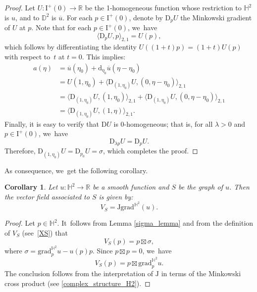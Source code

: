 \documentclass[11pt]{article}
\theoremstyle{plain}
\newtheorem{cor}{Corollary}[section]
\theoremstyle{definition}
\newcommand{\I}{\mathrm{I}}
\newcommand{\grad}{\mathrm{grad}^{\mathbb{H}^2}}
\newcommand{\J}{\mathrm{J}}
\begin{document}
\begin{proof}
Let \(U: \I^+(0) \to \mathbb{R} \) be the 1-homogeneous function whose restriction to \(\mathbb{H}^2 \) is \(u \), and to \(\mathbb{D}^2 \) is \(\overline{u} \).
For each \(p \in \I^{+}(0) \), denote by \(\mathrm{D}_p U \) the Minkowski gradient of \(U \) at \(p \). Note that for each \(p \in \I^{+}(0) \), we~have
\[
\langle \mathrm{D}_p U, p \rangle_{2,1} = U(p),
\]
which follows by differentiating the identity \(U((1+t)p) = (1+t)U(p) \) with respect to~\(t \) at \(t=0 \).
This implies:
\begin{align*}
a(\eta) &= \overline{u}(\eta_0) + \mathrm{d}_{\eta_0} \overline{u}(\eta - \eta_0) \\
&= U(1, \eta_0) + \langle \mathrm{D}_{(1, \eta_0)} U, (0, \eta - \eta_0) \rangle_{2,1} \\
&= \langle \mathrm{D}_{(1, \eta_0)} U, (1, \eta_0) \rangle_{2,1} + \langle \mathrm{D}_{(1, \eta_0)} U, (0, \eta - \eta_0) \rangle_{2,1} \\
&= \langle \mathrm{D}_{(1, \eta_0)} U, (1, \eta) \rangle_{2,1}.
\end{align*}
Finally, it is easy to verify that \(\mathrm{D}U \) is 0-homogeneous; that is, for all \(\lambda > 0 \) and \(p \in \I^{+}(0) \), we~have
\[
\mathrm{D}_{\lambda p} U = \mathrm{D}_p U.
\]
Therefore, \(\mathrm{D}_{(1, \eta_0)} U = \mathrm{D}_{p_0} U = \sigma \), which completes the proof.
\end{proof}
As consequence, we~get the following corollary.
\begin{cor}\label{cor_formule_XS}
Let $u:\mathbb{H}^2\to\mathbb{R}$ be a smooth function and $S$ be the graph of $u$. Then the vector field associated to $S$ is given by:
\[
V_S=\J\grad(u).
\]
\end{cor}
\begin{proof}
Let $p\in\mathbb{H}^2$. It~follows from Lemma \ref{sigma_lemma} and from the definition of $V_S$ (see~\eqref{XS}) that
\[
V_S(p)=p\boxtimes\sigma,
\]
where
$\sigma=\grad_{p}u-u(p)p$. Since $p\boxtimes p=0$, we~have
\[
V_S(p)=p\boxtimes\grad_{p}u.
\]The conclusion follows from the interpretation of $\J$ in terms of the Minkowski cross product (see \eqref{complex_structure_H2}).
\end{proof}
\end{document}
